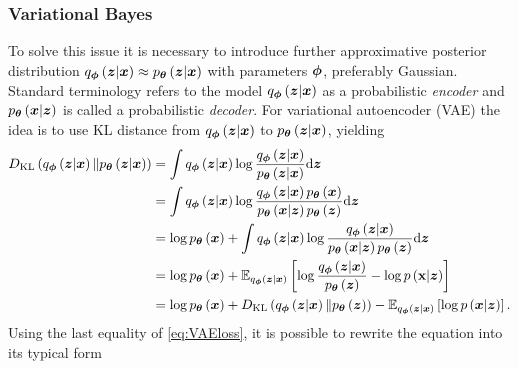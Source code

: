 \subsubsection{Variational Bayes}
To solve this issue it is necessary to introduce further approximative posterior distribution $q_{\boldsymbol{\phi}}\left(\boldsymbol{z}\vert\boldsymbol{x}\right) \approx p_{\boldsymbol{\theta}}\left(\boldsymbol{z}\vert\boldsymbol{x}\right)$ with parameters $\boldsymbol{\phi}$, preferably Gaussian. Standard terminology refers to the model $q_{\boldsymbol{\phi}}\left(\boldsymbol{z}\vert\boldsymbol{x}\right)$ as a probabilistic \emph{encoder} and  $p_{\boldsymbol{\theta}}\left(\boldsymbol{x}\vert \boldsymbol{z}\right)$ is called a probabilistic \emph{decoder}.
For variational autoencoder (VAE) the idea is to use KL distance from $q_{\boldsymbol{\phi}}\left(\boldsymbol{z}\vert\boldsymbol{x}\right)$ to $p_{\boldsymbol{\theta}}\left(\boldsymbol{z}\vert \boldsymbol{x}\right)$, yielding
\begin{equation}\label{eq:VAEloss}
\begin{split}
D_{\mathrm{KL}}\left(q_{\boldsymbol{\phi}}\left(\boldsymbol{z}\vert \boldsymbol{x} \right) \Vert p_{\boldsymbol{\theta}}\left(\boldsymbol{z}\vert \boldsymbol{x}\right)\right) & = 
\int q_{\boldsymbol{\phi}}\left(\boldsymbol{z}\vert \boldsymbol{x} \right) \log \frac{q_{\boldsymbol{\phi}}\left(\boldsymbol{z}\vert \boldsymbol{x} \right)}{p_{\boldsymbol{\theta}}\left(\boldsymbol{z}\vert \boldsymbol{x}\right)} \mathrm{d}{\boldsymbol{z}} \\
& =  \int q_{\boldsymbol{\phi}}\left(\boldsymbol{z}\vert \boldsymbol{x} \right) \log \frac{q_{\boldsymbol{\phi}}\left(\boldsymbol{z}\vert \boldsymbol{x} \right)p_{\boldsymbol{\theta}}\left(\boldsymbol{x}\right)}{p_{\boldsymbol{\theta}}\left(\boldsymbol{x} \vert \boldsymbol{z}\right) p_{\boldsymbol{\theta}}\left(\boldsymbol{z}\right)} \mathrm{d}{\boldsymbol{z}} \\
& = \log p_{\boldsymbol{\theta}}\left(\boldsymbol{x}\right) +  \int q_{\boldsymbol{\phi}}\left(\boldsymbol{z}\vert \boldsymbol{x} \right) \log \frac{q_{\boldsymbol{\phi}}\left(\boldsymbol{z}\vert \boldsymbol{x} \right)}{p_{\boldsymbol{\theta}}\left(\boldsymbol{x} \vert \boldsymbol{z}\right)p_{\boldsymbol{\theta}}\left(\boldsymbol{z}\right) } \mathrm{d}{\boldsymbol{z}} \\
& = \log p_{\boldsymbol{\theta}}\left(\boldsymbol{x}\right) +  \mathbb{E}_{q_{\boldsymbol{\phi}}\left(\boldsymbol{z}\vert \boldsymbol{x} \right)}\left[\log\frac{q_{\boldsymbol{\phi}}\left(\boldsymbol{z}\vert \boldsymbol{x} \right)}{p_{\boldsymbol{\theta}}\left(\boldsymbol{z}\right)} - \log p\left(\textbf{x}\vert \boldsymbol{z}\right)\right]\\
    & = \log p_{\boldsymbol{\theta}}\left(\boldsymbol{x}\right) +D_{\mathrm{KL}} \left(q_{\boldsymbol{\phi}}\left(\boldsymbol{z}\vert \boldsymbol{x} \right) \Vert p_{\boldsymbol{\theta}}\left(\boldsymbol{z}\right) \right) -  \mathbb{E}_{q_{\boldsymbol{\phi}}\left(\boldsymbol{z}\vert \boldsymbol{x} \right)}\left[\log p\left(\boldsymbol{x}\vert \boldsymbol{z}\right)\right].
 \end{split}
\end{equation}
Using the last equality of \eqref{eq:VAEloss}, it is possible to rewrite the equation into its typical form
